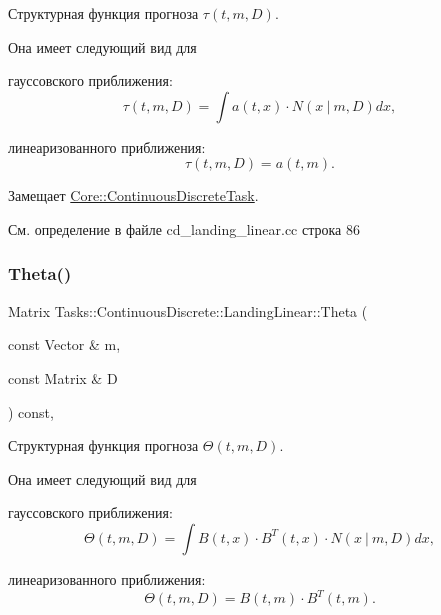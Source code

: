 Структурная функция прогноза $\tau(t, m, D)$. 

Она имеет следующий вид для


\begin{DoxyItemize}
\item гауссовского приближения\+: \[\tau(t, m, D) = \int a(t,x)\cdot N(x\ |\ m, D)dx,\]
\item линеаризованного приближения\+: \[\tau(t, m, D) = a(t, m).\] 
\end{DoxyItemize}

Замещает \hyperlink{class_core_1_1_continuous_discrete_task_a491a9dc4463031a6f5f2eeda24d8ba9c}{Core\+::\+Continuous\+Discrete\+Task}.



См. определение в файле cd\+\_\+landing\+\_\+linear.\+cc строка 86

\hypertarget{class_tasks_1_1_continuous_discrete_1_1_landing_linear_a783147d41d5d8dff4facd246fc064bb4}{}\label{class_tasks_1_1_continuous_discrete_1_1_landing_linear_a783147d41d5d8dff4facd246fc064bb4} 
\subsubsection{\texorpdfstring{Theta()}{Theta()}}
{\footnotesize\ttfamily Matrix Tasks\+::\+Continuous\+Discrete\+::\+Landing\+Linear\+::\+Theta (\begin{DoxyParamCaption}\item[{const Vector \&}]{m,  }\item[{const Matrix \&}]{D }\end{DoxyParamCaption}) const\hspace{0.3cm}{\ttfamily [override]}, {\ttfamily [virtual]}}



Структурная функция прогноза $\Theta(t,m,D)$. 

Она имеет следующий вид для


\begin{DoxyItemize}
\item гауссовского приближения\+: \[\Theta(t,m,D) = \int B(t,x)\cdot B^T(t,x)\cdot N(x\ |\ m,D)dx,\]
\item линеаризованного приближения\+: \[\Theta(t,m,D) = B(t,m)\cdot B^T(t,m).\] 
\end{DoxyItemize}

